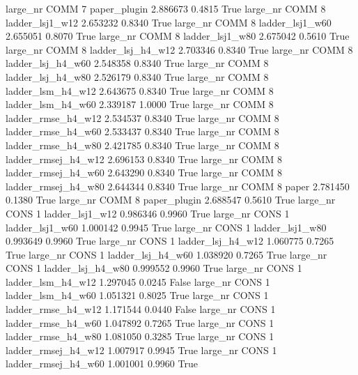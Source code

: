   large_nr     COMM                 7        paper_plugin   2.886673      0.4815    True
  large_nr     COMM                 8     ladder_lsj1_w12   2.653232      0.8340    True
  large_nr     COMM                 8     ladder_lsj1_w60   2.655051      0.8070    True
  large_nr     COMM                 8     ladder_lsj1_w80   2.675042      0.5610    True
  large_nr     COMM                 8   ladder_lsj_h4_w12   2.703346      0.8340    True
  large_nr     COMM                 8   ladder_lsj_h4_w60   2.548358      0.8340    True
  large_nr     COMM                 8   ladder_lsj_h4_w80   2.526179      0.8340    True
  large_nr     COMM                 8   ladder_lsm_h4_w12   2.643675      0.8340    True
  large_nr     COMM                 8   ladder_lsm_h4_w60   2.339187      1.0000    True
  large_nr     COMM                 8  ladder_rmse_h4_w12   2.534537      0.8340    True
  large_nr     COMM                 8  ladder_rmse_h4_w60   2.533437      0.8340    True
  large_nr     COMM                 8  ladder_rmse_h4_w80   2.421785      0.8340    True
  large_nr     COMM                 8 ladder_rmsej_h4_w12   2.696153      0.8340    True
  large_nr     COMM                 8 ladder_rmsej_h4_w60   2.643290      0.8340    True
  large_nr     COMM                 8 ladder_rmsej_h4_w80   2.644344      0.8340    True
  large_nr     COMM                 8               paper   2.781450      0.1380    True
  large_nr     COMM                 8        paper_plugin   2.688547      0.5610    True
  large_nr     CONS                 1     ladder_lsj1_w12   0.986346      0.9960    True
  large_nr     CONS                 1     ladder_lsj1_w60   1.000142      0.9945    True
  large_nr     CONS                 1     ladder_lsj1_w80   0.993649      0.9960    True
  large_nr     CONS                 1   ladder_lsj_h4_w12   1.060775      0.7265    True
  large_nr     CONS                 1   ladder_lsj_h4_w60   1.038920      0.7265    True
  large_nr     CONS                 1   ladder_lsj_h4_w80   0.999552      0.9960    True
  large_nr     CONS                 1   ladder_lsm_h4_w12   1.297045      0.0245   False
  large_nr     CONS                 1   ladder_lsm_h4_w60   1.051321      0.8025    True
  large_nr     CONS                 1  ladder_rmse_h4_w12   1.171544      0.0440   False
  large_nr     CONS                 1  ladder_rmse_h4_w60   1.047892      0.7265    True
  large_nr     CONS                 1  ladder_rmse_h4_w80   1.081050      0.3285    True
  large_nr     CONS                 1 ladder_rmsej_h4_w12   1.007917      0.9945    True
  large_nr     CONS                 1 ladder_rmsej_h4_w60   1.001001      0.9960    True
